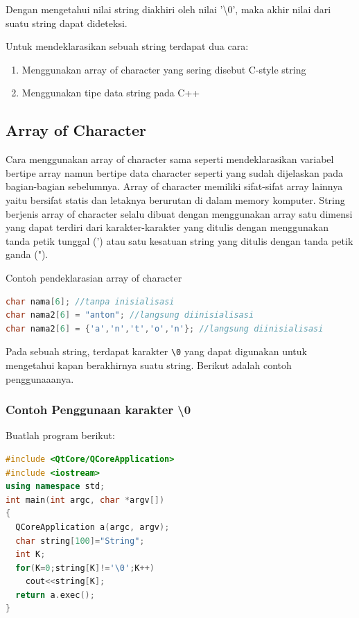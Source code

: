 Dengan mengetahui nilai string diakhiri oleh nilai '\textbackslash0', maka akhir
nilai dari suatu string dapat dideteksi.

Untuk mendeklarasikan sebuah string terdapat dua cara:

\begin{enumerate}


\item
  Menggunakan array of character yang sering disebut C-style string
\item
  Menggunakan tipe data string pada C++
\end{enumerate}

\subsection{Array of Character}\label{array-of-character}

Cara menggunakan array of character sama seperti mendeklarasikan
variabel bertipe array namun bertipe data character seperti yang sudah
dijelaskan pada bagian-bagian sebelumnya. Array of character memiliki
sifat-sifat array lainnya yaitu bersifat statis dan letaknya berurutan
di dalam memory komputer. String berjenis array of character selalu
dibuat dengan menggunakan array satu dimensi yang dapat terdiri dari
karakter-karakter yang ditulis dengan menggunakan tanda petik tunggal
(') atau satu kesatuan string yang ditulis dengan tanda petik ganda
(").

Contoh pendeklarasian array of character

\begin{lstlisting}[language=c++, numbers=none]
char nama[6]; //tanpa inisialisasi
char nama2[6] = "anton"; //langsung diinisialisasi
char nama2[6] = {'a','n','t','o','n'}; //langsung diinisialisasi
\end{lstlisting}

Pada sebuah string, terdapat karakter \texttt{\textbackslash{}0} yang
dapat digunakan untuk mengetahui kapan berakhirnya suatu string. Berikut
adalah contoh penggunaaanya.

\subsubsection*{Contoh  Penggunaan karakter \textbackslash{0}}

Buatlah program berikut:

\begin{lstlisting}[language=c++, caption=Penggunaan karakter \textbackslash{0}, label=contoh3-14]
#include <QtCore/QCoreApplication>
#include <iostream>
using namespace std;
int main(int argc, char *argv[])
{
  QCoreApplication a(argc, argv);
  char string[100]="String";
  int K;
  for(K=0;string[K]!='\0';K++)
    cout<<string[K];
  return a.exec();
}
\end{lstlisting}

